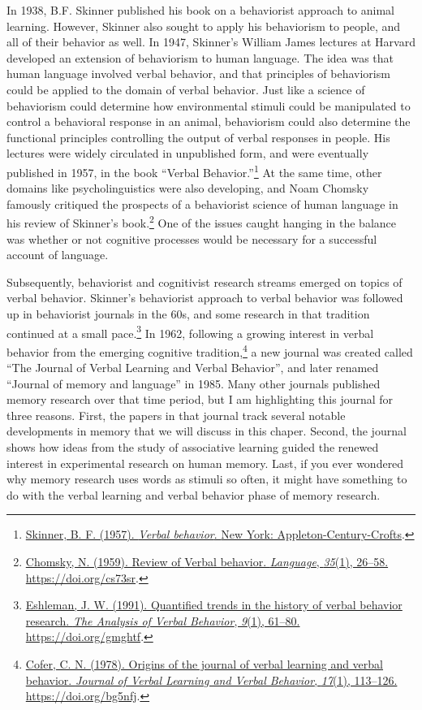 \documentclass[
  oneside,
  12pt]{crumpbook}
\begin{document}
In 1938, B.F. Skinner published his book on a behaviorist approach to animal learning. However, Skinner also sought to apply his behaviorism to people, and all of their behavior as well. In 1947, Skinner's William James lectures at Harvard developed an extension of behaviorism to human language. The idea was that human language involved verbal behavior, and that principles of behaviorism could be applied to the domain of verbal behavior. Just like a science of behaviorism could determine how environmental stimuli could be manipulated to control a behavioral response in an animal, behaviorism could also determine the functional principles controlling the output of verbal responses in people. His lectures were widely circulated in unpublished form, and were eventually published in 1957, in the book ``Verbal Behavior.''\footnote{\protect\hyperlink{ref-skinnerVerbalBehavior1957}{Skinner, B. F. (1957). \emph{Verbal behavior}. {New York: Appleton-Century-Crofts}}.} At the same time, other domains like psycholinguistics were also developing, and Noam Chomsky famously critiqued the prospects of a behaviorist science of human language in his review of Skinner's book.\footnote{\protect\hyperlink{ref-chomskyReviewVerbalBehavior1959}{Chomsky, N. (1959). Review of {Verbal} behavior. \emph{Language}, \emph{35}(1), 26--58. \url{https://doi.org/cs73sr}}.} One of the issues caught hanging in the balance was whether or not cognitive processes would be necessary for a successful account of language.

Subsequently, behaviorist and cognitivist research streams emerged on topics of verbal behavior. Skinner's behaviorist approach to verbal behavior was followed up in behaviorist journals in the 60s, and some research in that tradition continued at a small pace.\footnote{\protect\hyperlink{ref-eshlemanQuantifiedTrendsHistory1991}{Eshleman, J. W. (1991). Quantified trends in the history of verbal behavior research. \emph{The Analysis of Verbal Behavior}, \emph{9}(1), 61--80. \url{https://doi.org/gmghtf}}.} In 1962, following a growing interest in verbal behavior from the emerging cognitive tradition,\footnote{\protect\hyperlink{ref-coferOriginsJournalVerbal1978}{Cofer, C. N. (1978). Origins of the journal of verbal learning and verbal behavior. \emph{Journal of Verbal Learning and Verbal Behavior}, \emph{17}(1), 113--126. \url{https://doi.org/bg5nfj}}.} a new journal was created called ``The Journal of Verbal Learning and Verbal Behavior'', and later renamed ``Journal of memory and language'' in 1985. Many other journals published memory research over that time period, but I am highlighting this journal for three reasons. First, the papers in that journal track several notable developments in memory that we will discuss in this chaper. Second, the journal shows how ideas from the study of associative learning guided the renewed interest in experimental research on human memory. Last, if you ever wondered why memory research uses words as stimuli so often, it might have something to do with the verbal learning and verbal behavior phase of memory research.
\end{document}
